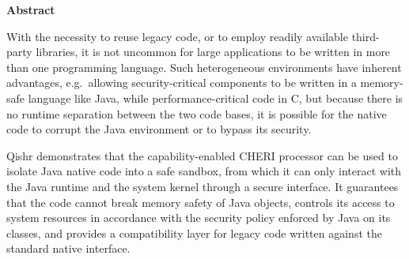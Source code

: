 \newpage
{\Huge \bf Abstract}
\vspace{24pt} 

With the necessity to reuse legacy code, or to employ readily available third-party libraries, it is not uncommon for large applications to be written in more than one programming language. Such heterogeneous environments have inherent advantages, e.g.\ allowing security-critical components to be written in a memory-safe language like Java, while performance-critical code in C, but because there is no runtime separation between the two code bases, it is possible for the native code to corrupt the Java environment or to bypass its security.

Qishr demonstrates that the capability-enabled CHERI processor can be used to isolate Java native code into a safe sandbox, from which it can only interact with the Java runtime and the system kernel through a secure interface. It guarantees that the code cannot break memory safety of Java objects, controls its access to system resources in accordance with the security policy enforced by Java on its classes, and provides a compatibility layer for legacy code written against the standard native interface.

\newpage
\vspace*{\fill}
